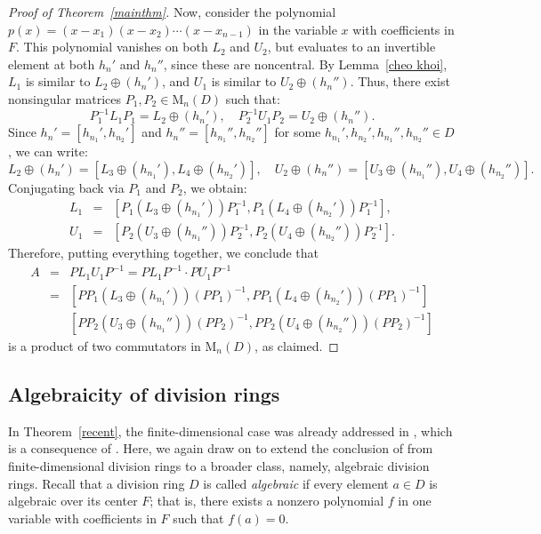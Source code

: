 \documentclass[11pt]{article}
\theoremstyle{definition}
\begin{document}
{{{{\begin{proof}[Proof of Theorem~\ref{mainthm}]
					Now, consider the polynomial $p(x) = (x - x_1)(x - x_2) \cdots (x - x_{n-1})$ in the variable $x$ with coefficients in $F$. This polynomial vanishes on both $L_2$ and $U_2$, but evaluates to an invertible element at both $h_n'$ and $h_n''$, since these are noncentral. By Lemma~\ref{cheo khoi}, $L_1$ is similar to $L_2 \oplus (h_n')$, and $U_1$ is similar to $U_2 \oplus (h_n'')$. Thus, there exist nonsingular matrices $P_1, P_2 \in \mathrm{M}_n(D)$ such that:
					$$
					P_1^{-1} L_1 P_1 = L_2 \oplus (h_n'), \quad P_2^{-1} U_1 P_2 = U_2 \oplus (h_n'').
					$$ Since $h_n' = [h_{n_1}', h_{n_2}']$ and $h_n'' = [h_{n_1}'', h_{n_2}'']$ for some $h_{n_1}',h_{n_2}',h_{n_1}'',h_{n_2}''\in D$, we can write:
					$$
					L_2 \oplus (h_n') = [L_3 \oplus (h_{n_1}'), L_4 \oplus (h_{n_2}')], \quad
					U_2 \oplus (h_n'') = [U_3 \oplus (h_{n_1}''), U_4 \oplus (h_{n_2}'')].
					$$ Conjugating back via $P_1$ and $P_2$, we obtain: \begin{eqnarray*}
						L_1 &=& [P_1 (L_3 \oplus (h_{n_1}')) P_1^{-1}, P_1 (L_4 \oplus (h_{n_2}')) P_1^{-1}],\\
						U_1 &=& [P_2 (U_3 \oplus (h_{n_1}'')) P_2^{-1}, P_2 (U_4 \oplus (h_{n_2}'')) P_2^{-1}].	
					\end{eqnarray*} Therefore, putting everything together, we conclude that
					\begin{eqnarray*}
						A&=&PL_1U_1P^{-1}=PL_1P^{-1}\cdot PU_1P^{-1}\\
						&=&[PP_1(L_3\oplus(h_{n_1}'))(PP_1)^{-1},PP_1(L_4\oplus (h_{n_2}'))(PP_1)^{-1}]\\
						&& [PP_2(U_3\oplus(h_{n_1}''))(PP_2)^{-1},PP_2(U_4\oplus (h_{n_2}''))(PP_2)^{-1}]
					\end{eqnarray*} is a product of two commutators in $\mathrm{M}_n(D)$, as claimed.
				\end{proof}
				
				\subsection{Algebraicity of division rings}
				
			  In Theorem~\ref{recent}, the finite-dimensional case was already addressed in \cite[Corollary~4.5]{Pa_Bre_25}, which is a consequence of  \cite[Theorem~4.4]{Pa_Bre_25}.
				Here, we again draw on \cite[Theorem~4.4]{Pa_Bre_25} to extend the conclusion of  \cite[Corollary~4.5]{Pa_Bre_25} from finite-dimensional division rings to a broader  class, namely, algebraic division rings.  Recall that a division ring $D$ is called \emph{algebraic} if every element $a \in D$ is algebraic over  its center $F$; that is, there exists a nonzero polynomial $f$ in one variable with coefficients in $F$ such that $f(a) = 0$.
				
}}}}
\end{document}
